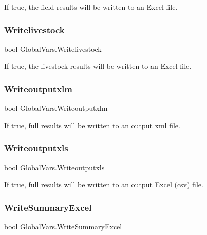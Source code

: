 If true, the field results will be written to an Excel file. 

\mbox{\label{class_global_vars_a1dc3e2876af71bd82de8365638c291ff}} 
\subsubsection{\texorpdfstring{Writelivestock}{Writelivestock}}
{\footnotesize\ttfamily bool Global\+Vars.\+Writelivestock}



If true, the livestock results will be written to an Excel file. 

\mbox{\label{class_global_vars_a863dc1126b2e5bf517e26a45cf069fbb}} 
\subsubsection{\texorpdfstring{Writeoutputxlm}{Writeoutputxlm}}
{\footnotesize\ttfamily bool Global\+Vars.\+Writeoutputxlm}



If true, full results will be written to an output xml file. 

\mbox{\label{class_global_vars_a26572bfb2be10514cb90a8dbde59707d}} 
\subsubsection{\texorpdfstring{Writeoutputxls}{Writeoutputxls}}
{\footnotesize\ttfamily bool Global\+Vars.\+Writeoutputxls}



If true, full results will be written to an output Excel (csv) file. 

\mbox{\label{class_global_vars_acc134ab3675bd4d699ae33e0469b46f5}} 
\subsubsection{\texorpdfstring{WriteSummaryExcel}{WriteSummaryExcel}}
{\footnotesize\ttfamily bool Global\+Vars.\+Write\+Summary\+Excel}



